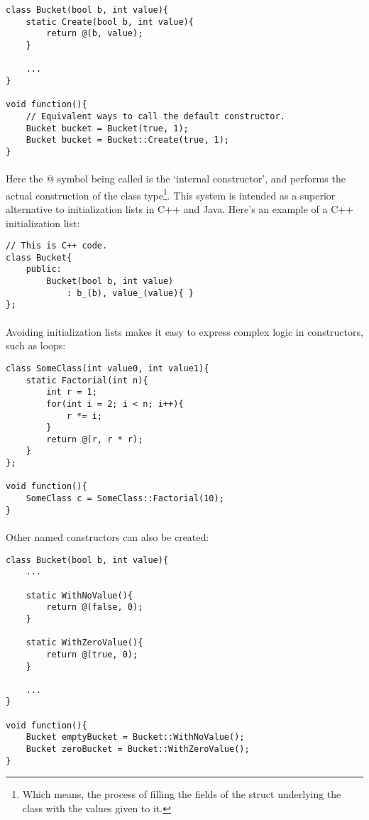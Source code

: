 \documentclass[12pt,twoside,notitlepage]{report}
\begin{document}
\begin{lstlisting}
class Bucket(bool b, int value){
	static Create(bool b, int value){
		return @(b, value);
	}

	...
}

void function(){
	// Equivalent ways to call the default constructor.
	Bucket bucket = Bucket(true, 1);
	Bucket bucket = Bucket::Create(true, 1);
}
\end{lstlisting}


\paragraph{}
Here the @ symbol being called is the `internal constructor', and performs the actual construction of the class type\footnote{Which means, the process of filling the fields of the struct underlying the class with the values given to it.}. This system is intended as a superior alternative to initialization lists in C++ and Java. Here's an example of a C++ initialization list:


\begin{lstlisting}
// This is C++ code.
class Bucket{
	public:
		Bucket(bool b, int value)
			: b_(b), value_(value){ }
};
\end{lstlisting}


\paragraph{}
Avoiding initialization lists makes it easy to express complex logic in constructors, such as loops:


\begin{lstlisting}
class SomeClass(int value0, int value1){
	static Factorial(int n){
		int r = 1;
		for(int i = 2; i < n; i++){
			r *= i;
		}
		return @(r, r * r);
	}
};

void function(){
	SomeClass c = SomeClass::Factorial(10);
}
\end{lstlisting}


\paragraph{}
Other named constructors can also be created:


\begin{lstlisting}
class Bucket(bool b, int value){
	...
	
	static WithNoValue(){
		return @(false, 0);
	}
	
	static WithZeroValue(){
		return @(true, 0);
	}

	...
}

void function(){
	Bucket emptyBucket = Bucket::WithNoValue();
	Bucket zeroBucket = Bucket::WithZeroValue();
}
\end{lstlisting}
\end{document}
